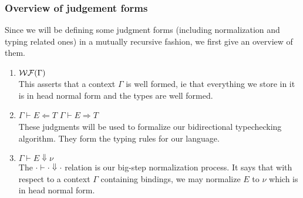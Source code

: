\documentclass{article}
\begin{document}
\subsubsection{Overview of judgement forms}
Since we will be defining some judgment forms (including normalization and
typing related ones) in a mutually recursive fashion, we first give an
overview of them.

\begin{enumerate}
\item $\operatorname{\mathcal{WF}}(\Gamma)$ \\
  This asserts that a context $\Gamma$ is well formed, ie that everything we
  store in it is in head normal form and the types are well formed.

\item $\Gamma \vdash E \Leftarrow T$ \qquad $\Gamma \vdash E \Rightarrow T$ \\
  These judgments will be used to formalize our bidirectional typechecking
  algorithm. They form the typing rules for our language.

  


\item $\Gamma \vdash E \Downarrow \nu$ \\
  The $\cdot \vdash \cdot \Downarrow \cdot$ relation is our big-step normalization
  process.
  It says that with respect to a context $\Gamma$ containing bindings, we
  may normalize $E$ to $\nu$ which is in head normal form.
\end{enumerate}
\end{document}
